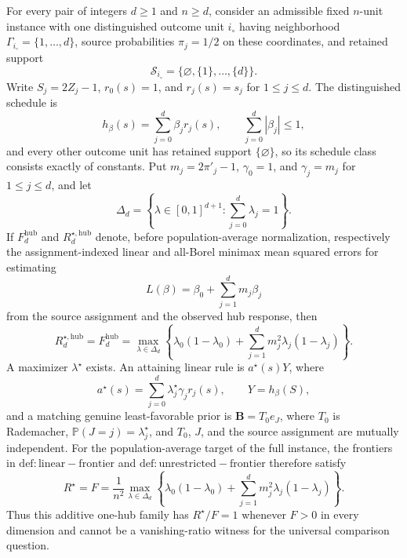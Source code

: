 For every pair of integers \(d\geq 1\) and \(n\geq d\), consider an admissible fixed \(n\)-unit instance with one distinguished outcome unit \(i_{\circ}\) having neighborhood \(\Gamma_{i_{\circ}}=\{1,\ldots,d\}\), source probabilities \(\pi_j=1/2\) on these coordinates, and retained support
\[
 \mathcal S_{i_{\circ}}=\{\varnothing,\{1\},\ldots,\{d\}\}.
\]
Write \(S_j=2Z_j-1\), \(r_0(s)=1\), and \(r_j(s)=s_j\) for \(1\leq j\leq d\).  The distinguished schedule is
\[
 h_{\beta}(s)=\sum_{j=0}^d\beta_jr_j(s),
 \qquad
 \sum_{j=0}^d|\beta_j|\leq 1,
\]
and every other outcome unit has retained support \(\{\varnothing\}\), so its schedule class consists exactly of constants.  Put \(m_j=2\pi'_j-1\), \(\gamma_0=1\), and \(\gamma_j=m_j\) for \(1\leq j\leq d\), and let
\[
 \Delta_d=\left\{\lambda\in[0,1]^{d+1}:\sum_{j=0}^d\lambda_j=1\right\}.
\]
If \(F_d^{\mathrm{hub}}\) and \(R_d^{\star,\mathrm{hub}}\) denote, before population-average normalization, respectively the assignment-indexed linear and all-Borel minimax mean squared errors for estimating
\[
 L(\beta)=\beta_0+\sum_{j=1}^dm_j\beta_j
\]
from the source assignment and the observed hub response, then
\[
 R_d^{\star,\mathrm{hub}}=F_d^{\mathrm{hub}}
 =\max_{\lambda\in\Delta_d}
 \left\{\lambda_0(1-\lambda_0)
 +\sum_{j=1}^dm_j^2\lambda_j(1-\lambda_j)\right\}.
\]
A maximizer \(\lambda^{\star}\) exists.  An attaining linear rule is \(a^{\star}(s)Y\), where
\[
 a^{\star}(s)=\sum_{j=0}^d\lambda_j^{\star}\gamma_jr_j(s),
 \qquad
 Y=h_{\beta}(S),
\]
and a matching genuine least-favorable prior is \(\mathbf B=T_0e_J\), where \(T_0\) is Rademacher, \(\mathbb P(J=j)=\lambda_j^{\star}\), and \(T_0\), \(J\), and the source assignment are mutually independent.  For the population-average target of the full instance, the frontiers in \(\mathrm{def:linear-frontier}\) and \(\mathrm{def:unrestricted-frontier}\) therefore satisfy
\[
 R^{\star}=F
 =\frac{1}{n^2}\max_{\lambda\in\Delta_d}
 \left\{\lambda_0(1-\lambda_0)
 +\sum_{j=1}^dm_j^2\lambda_j(1-\lambda_j)\right\}.
\]
Thus this additive one-hub family has \(R^{\star}/F=1\) whenever \(F>0\) in every dimension and cannot be a vanishing-ratio witness for the universal comparison question.